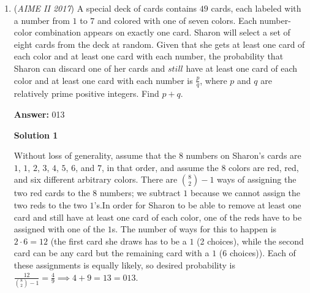 \begin{enumerate}
Clearly $1+n$ is an integer. The part we need to verify as an integer is, upon common denominator, $\frac{360n^2+120n^3+30n^4+6n^5+n^6}{720}$. Clearly, the numerator must be even for the fraction to be an integer. Therefore, $n^6$ is even and n is even, aka $n=2k$ for some integer $k$. Then, we can substitute $n=2k$ and see that $\frac{n^2}{2}$ is trivially integral. Then, substitute for the rest of the non-confirmed-integral terms and get $\frac{60k^3+30k^4+12k^5+4k^6}{45}$. It is also clear that for this to be an integer, which it needs to be, the numerator has to be divisible by 3. The only term we worry about is the $4k^6$, and we see that $k=3b$ for some integer $b$. From there we now know that $n=6b$. If we substitute again, we see that all parts except the last two fractions are trivially integral. In order for the last two fractions to sum to an integer we see that $n^5(6n+1) \equiv 0 \pmod5$, so combining with divisibility by 6, $n$ is $24$ or $0\pmod{30}$. There are $67$ cases for each, hence the answer $\boxed{134}$.

 


	\item (\textit{AIME II 2017}) A special deck of cards contains $49$ cards, each labeled with a number from $1$ to $7$ and colored with one of seven colors. Each number-color combination appears on exactly one card. Sharon will select a set of eight cards from the deck at random. Given that she gets at least one card of each color and at least one card with each number, the probability that Sharon can discard one of her cards and $\textit{still}$ have at least one card of each color and at least one card with each number is $\frac{p}{q}$, where $p$ and $q$ are relatively prime positive integers. Find $p+q$.


 
 \textbf{Answer: }013



\textbf{Solution 1}

Without loss of generality, assume that the $8$ numbers on Sharon's cards are $1$, $1$, $2$, $3$, $4$, $5$, $6$, and $7$, in that order, and assume the $8$ colors are red, red, and six different arbitrary colors. There are ${8\choose2}-1$ ways of assigning the two red cards to the $8$ numbers; we subtract $1$ because we cannot assign the two reds to the two $1$'s.In order for Sharon to be able to remove at least one card and still have at least one card of each color, one of the reds have to be assigned with one of the $1$s. The number of ways for this to happen is $2 \cdot 6 = 12$ (the first card she draws has to be a $1$ (2 choices), while the second card can be any card but the remaining card with a $1$ (6 choices)). Each of these assignments is equally likely, so desired probability is $\frac{12}{{8\choose2}-1}=\frac{4}{9} \implies 4 + 9 = 13 = \boxed{013}$.


\end{enumerate}

